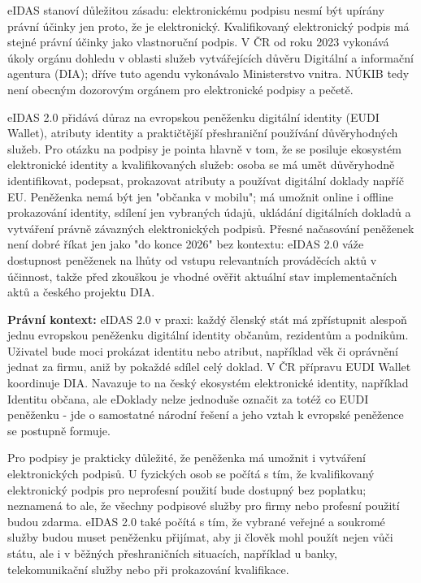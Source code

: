 \documentclass[11pt,a4paper]{article}
\newcommand{\pravobox}[1]{\begin{tcolorbox}[breakable,enhanced,colback=yellow!18,colframe=yellow!45!black,boxrule=0pt,arc=1mm,left=5pt,right=5pt,top=5pt,bottom=5pt,before skip=6pt,after skip=6pt]\textbf{Právní kontext:} #1\end{tcolorbox}}
\begin{document}
eIDAS stanoví důležitou zásadu: elektronickému podpisu nesmí být upírány právní účinky jen proto, že je elektronický. Kvalifikovaný elektronický podpis má stejné právní účinky jako vlastnoruční podpis. V ČR od roku 2023 vykonává úkoly orgánu dohledu v oblasti služeb vytvářejících důvěru Digitální a informační agentura (DIA); dříve tuto agendu vykonávalo Ministerstvo vnitra. NÚKIB tedy není obecným dozorovým orgánem pro elektronické podpisy a pečetě.

eIDAS 2.0 přidává důraz na evropskou peněženku digitální identity (EUDI Wallet), atributy identity a praktičtější přeshraniční používání důvěryhodných služeb. Pro otázku na podpisy je pointa hlavně v tom, že se posiluje ekosystém elektronické identity a kvalifikovaných služeb: osoba se má umět důvěryhodně identifikovat, podepsat, prokazovat atributy a používat digitální doklady napříč EU. Peněženka nemá být jen "občanka v mobilu"; má umožnit online i offline prokazování identity, sdílení jen vybraných údajů, ukládání digitálních dokladů a vytváření právně závazných elektronických podpisů. Přesné načasování peněženek není dobré říkat jen jako "do konce 2026" bez kontextu: eIDAS 2.0 váže dostupnost peněženek na lhůty od vstupu relevantních prováděcích aktů v účinnost, takže před zkouškou je vhodné ověřit aktuální stav implementačních aktů a českého projektu DIA.

\pravobox{eIDAS 2.0 v praxi: každý členský stát má zpřístupnit alespoň jednu evropskou peněženku digitální identity občanům, rezidentům a podnikům. Uživatel bude moci prokázat identitu nebo atribut, například věk či oprávnění jednat za firmu, aniž by pokaždé sdílel celý doklad. V ČR přípravu EUDI Wallet koordinuje DIA. Navazuje to na český ekosystém elektronické identity, například Identitu občana, ale eDoklady nelze jednoduše označit za totéž co EUDI peněženku - jde o samostatné národní řešení a jeho vztah k evropské peněžence se postupně formuje.}

Pro podpisy je prakticky důležité, že peněženka má umožnit i vytváření elektronických podpisů. U fyzických osob se počítá s tím, že kvalifikovaný elektronický podpis pro neprofesní použití bude dostupný bez poplatku; neznamená to ale, že všechny podpisové služby pro firmy nebo profesní použití budou zdarma. eIDAS 2.0 také počítá s tím, že vybrané veřejné a soukromé služby budou muset peněženku přijímat, aby ji člověk mohl použít nejen vůči státu, ale i v běžných přeshraničních situacích, například u banky, telekomunikační služby nebo při prokazování kvalifikace.
\end{document}
